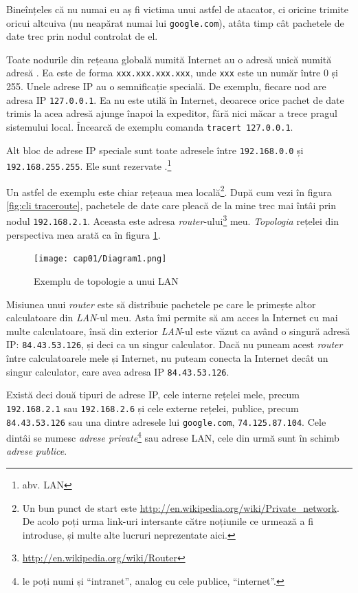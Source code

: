 Bineînțeles că nu numai eu aș fi
victima unui astfel de atacator, ci oricine trimite 
oricui altcuiva (nu neapărat numai lui \texttt{google.com}), atâta timp cât pachetele
de date trec prin nodul controlat de el.

Toate nodurile din rețeaua globală numită Internet au o adresă unică numită adresă
. Ea este de forma \texttt{xxx.xxx.xxx.xxx}, unde \texttt{xxx} este un număr
între 0 și 255. Unele adrese IP au o semnificație specială. De exemplu, fiecare
nod are adresa IP \texttt{127.0.0.1}. Ea nu este utilă în Internet, deoarece orice pachet
de date trimis la acea adresă ajunge înapoi la expeditor, fără nici măcar a trece
pragul sistemului local. Încearcă de exemplu comanda \texttt{tracert 127.0.0.1}.

Alt bloc de adrese IP speciale sunt toate adresele între \texttt{192.168.0.0} și
\texttt{192.168.255.255}. Ele sunt rezervate .\footnote{abv. LAN}

Un astfel de exemplu este chiar rețeaua mea
locală\footnote{Un bun punct de start este \url{http://en.wikipedia.org/wiki/Private_network}.
De acolo poți urma link-uri intersante către noțiunile ce urmează a fi introduse,
și multe alte lucruri neprezentate aici.}.
După cum vezi în figura \ref{fig:cli traceroute},
pachetele de date care pleacă de la mine trec mai întâi prin nodul \texttt{192.168.2.1}.
Aceasta este adresa \textsl{router}-ului\footnote{\url{http://en.wikipedia.org/wiki/Router}}
meu. \textsl{Topologia} rețelei din perspectiva mea
arată ca în figura \ref{fig:topologie}.

\begin{figure}[h]
  \centering
    \texttt{[image: cap01/Diagram1.png]}
  \caption{Exemplu de topologie a unui LAN}
  \label{fig:topologie}
\end{figure}

Misiunea unui \textsl{router} este să distribuie pachetele
pe care le primește altor calculatoare din \textsl{LAN}-ul meu. Asta îmi permite să am acces
la Internet cu mai multe calculatoare, însă din exterior \textsl{LAN}-ul este văzut ca
având o singură adresă IP: \texttt{84.43.53.126}, și deci ca un singur calculator. Dacă
nu puneam acest \textsl{router} între calculatoarele mele și Internet, nu puteam conecta
la Internet decât un singur calculator, care avea adresa IP \texttt{84.43.53.126}.

\sloppy Există deci două tipuri de adrese IP, cele interne rețelei mele, precum \texttt{192.168.2.1}
sau \texttt{192.168.2.6} și cele externe rețelei, publice, precum \texttt{84.43.53.126} sau una
dintre adresele lui \texttt{google.com}, \texttt{74.125.87.104}.
Cele dintâi se numesc \textsl{adrese private}\footnote{le poți numi și ``intranet'',
analog cu cele publice, ``internet''.}
sau adrese LAN, cele din urmă sunt în schimb \textsl{adrese publice}.


